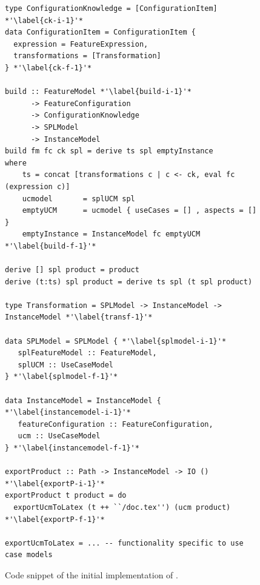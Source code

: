 
\begin{figure}[t!]
\bigskip
\begin{lstlisting}
type ConfigurationKnowledge = [ConfigurationItem] *'\label{ck-i-1}'*
data ConfigurationItem = ConfigurationItem {
  expression = FeatureExpression,
  transformations = [Transformation]
} *'\label{ck-f-1}'*

build :: FeatureModel *'\label{build-i-1}'*
      -> FeatureConfiguration
      -> ConfigurationKnowledge
      -> SPLModel
      -> InstanceModel
build fm fc ck spl = derive ts spl emptyInstance
where
    ts = concat [transformations c | c <- ck, eval fc (expression c)]
    ucmodel       = splUCM spl
    emptyUCM      = ucmodel { useCases = [] , aspects = [] }
    emptyInstance = InstanceModel fc emptyUCM *'\label{build-f-1}'*

derive [] spl product = product
derive (t:ts) spl product = derive ts spl (t spl product)

type Transformation = SPLModel -> InstanceModel -> InstanceModel *'\label{transf-1}'*

data SPLModel = SPLModel { *'\label{splmodel-i-1}'*
   splFeatureModel :: FeatureModel,
   splUCM :: UseCaseModel
} *'\label{splmodel-f-1}'*

data InstanceModel = InstanceModel { *'\label{instancemodel-i-1}'*
   featureConfiguration :: FeatureConfiguration,
   ucm :: UseCaseModel
} *'\label{instancemodel-f-1}'*

exportProduct :: Path -> InstanceModel -> IO () *'\label{exportP-i-1}'*
exportProduct t product = do
  exportUcmToLatex (t ++ ``/doc.tex'') (ucm product) *'\label{exportP-f-1}'*

exportUcmToLatex = ... -- functionality specific to use case models
\end{lstlisting}
\caption{Code snippet of the initial implementation of \hp.}
\label{fig:hp-initial}
\bigskip
\end{figure}



